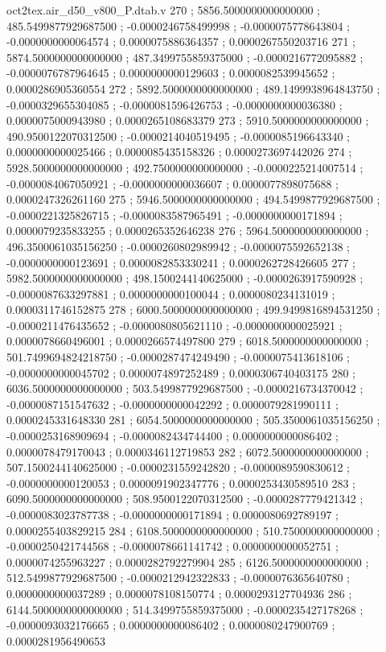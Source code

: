 \begin{filecontents}[overwrite]{oct2tex.air_d50_v800_P.dtab.v}
270 ; 5856.5000000000000000 ; 485.5499877929687500 ; -0.0000246758499998 ; -0.0000075778643804 ; -0.0000000000064574 ; 0.0000075886364357 ; 0.0000267550203716
271 ; 5874.5000000000000000 ; 487.3499755859375000 ; -0.0000216772095882 ; -0.0000076787964645 ; 0.0000000000129603 ; 0.0000082539945652 ; 0.0000286905360554
272 ; 5892.5000000000000000 ; 489.1499938964843750 ; -0.0000329655304085 ; -0.0000081596426753 ; -0.0000000000036380 ; 0.0000075000943980 ; 0.0000265108683379
273 ; 5910.5000000000000000 ; 490.9500122070312500 ; -0.0000214040519495 ; -0.0000085196643340 ; 0.0000000000025466 ; 0.0000085435158326 ; 0.0000273697442026
274 ; 5928.5000000000000000 ; 492.7500000000000000 ; -0.0000225214007514 ; -0.0000084067050921 ; -0.0000000000036607 ; 0.0000077898075688 ; 0.0000247326261160
275 ; 5946.5000000000000000 ; 494.5499877929687500 ; -0.0000221325826715 ; -0.0000083587965491 ; -0.0000000000171894 ; 0.0000079235833255 ; 0.0000265352646238
276 ; 5964.5000000000000000 ; 496.3500061035156250 ; -0.0000260802989942 ; -0.0000075592652138 ; -0.0000000000123691 ; 0.0000082853330241 ; 0.0000262728426605
277 ; 5982.5000000000000000 ; 498.1500244140625000 ; -0.0000263917590928 ; -0.0000087633297881 ; 0.0000000000100044 ; 0.0000080234131019 ; 0.0000311746152875
278 ; 6000.5000000000000000 ; 499.9499816894531250 ; -0.0000211476435652 ; -0.0000080805621110 ; -0.0000000000025921 ; 0.0000078660496001 ; 0.0000266574497800
279 ; 6018.5000000000000000 ; 501.7499694824218750 ; -0.0000287474249490 ; -0.0000075413618106 ; -0.0000000000045702 ; 0.0000074897252489 ; 0.0000306740403175
280 ; 6036.5000000000000000 ; 503.5499877929687500 ; -0.0000216734370042 ; -0.0000087151547632 ; -0.0000000000042292 ; 0.0000079281990111 ; 0.0000245331648330
281 ; 6054.5000000000000000 ; 505.3500061035156250 ; -0.0000253168909694 ; -0.0000082434744400 ; 0.0000000000086402 ; 0.0000078479170043 ; 0.0000346112719853
282 ; 6072.5000000000000000 ; 507.1500244140625000 ; -0.0000231559242820 ; -0.0000089590830612 ; -0.0000000000120053 ; 0.0000091902347776 ; 0.0000253430589510
283 ; 6090.5000000000000000 ; 508.9500122070312500 ; -0.0000287779421342 ; -0.0000083023787738 ; -0.0000000000171894 ; 0.0000080692789197 ; 0.0000255403829215
284 ; 6108.5000000000000000 ; 510.7500000000000000 ; -0.0000250421744568 ; -0.0000078661141742 ; 0.0000000000052751 ; 0.0000074255963227 ; 0.0000282792279904
285 ; 6126.5000000000000000 ; 512.5499877929687500 ; -0.0000212942322833 ; -0.0000076365640780 ; 0.0000000000037289 ; 0.0000078108150774 ; 0.0000293127704936
286 ; 6144.5000000000000000 ; 514.3499755859375000 ; -0.0000235427178268 ; -0.0000093032176665 ; 0.0000000000086402 ; 0.0000080247900769 ; 0.0000281956490653

\end{filecontents}

